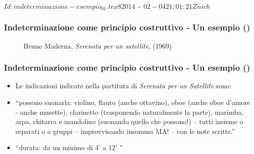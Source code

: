 %
%
\svnInfo $Id: indeterminazione-esempio_01.tex 8 2014-02-04 21:01:21Z nicb $

\setcounter{ms}{0}
\begin{frame}
    \frametitle{Indeterminazione come principio costruttivo - Un esempio ()}

    \begin{center}
        \begin{figure}
            \caption{Bruno Maderna, \emph{Serenata per un satellite}, (1969)}
        \end{figure}
    \end{center}

\end{frame}

\begin{frame}
    \frametitle{Indeterminazione come principio costruttivo - Un esempio ()}

    \begin{itemize}

        \item Le indicazioni indicate nella partitura di \emph{Serenata per un Satellite} sono:

        \item ``possono suonarla: violino, flauto (anche ottavino),
                oboe (anche oboe d'amore - anche musette),
                clarinetto (trasponendo naturalmente la parte),
                marimba, arpa, chitarra e mandolino (suonando quello che possono!) --
                tutti insieme o separati o a gruppi --
                improvvisando insomma MA! --
                con le note scritte.''

        \item ``durata: da un minimo di 4' a 12' ''

    \end{itemize}

\end{frame}

